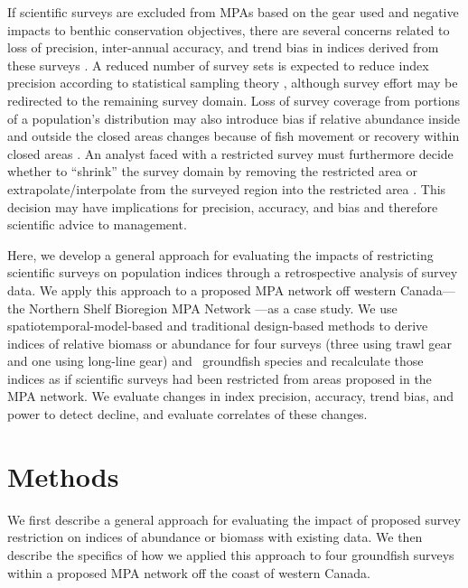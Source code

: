 \documentclass[12pt]{article}
\begin{document}
If scientific surveys are excluded from MPAs based on the gear used and negative impacts to benthic conservation objectives, there are several concerns related to loss of precision, inter-annual accuracy, and trend bias in indices derived from these surveys \citep{field2006, rideout2017, saarman2018, benoit2020national, benoit2020gulf, ices2023}.
A reduced number of survey sets is expected to reduce index precision according to statistical sampling theory \citep{cochran1977}, although survey effort may be redirected to the remaining survey domain.
Loss of survey coverage from portions of a population's distribution may also introduce bias if relative abundance inside and outside the closed areas changes because of fish movement or recovery within closed areas \citep[][]{benoit2020national}.
An analyst faced with a restricted survey must furthermore decide whether to ``shrink'' the survey domain by removing the restricted area \citep{rideout2017, benoit2020national} or extrapolate/interpolate from the surveyed region into the restricted area \citep{benoit2020national}.
This decision may have implications for precision, accuracy, and bias and therefore scientific advice to management.

Here, we develop a general approach for evaluating the impacts of restricting scientific surveys on population indices through a retrospective analysis of survey data.
We apply this approach to a proposed MPA network off western Canada---the Northern Shelf Bioregion MPA Network \citep[][Fig.~\ref{fig:map}]{dfo2022networkactionplan}---as a case study.
We use spatiotemporal-model-based and traditional design-based methods to derive indices of relative biomass or abundance for four surveys (three using trawl gear and one using long-line gear) and \nSpp\ groundfish species and recalculate those indices as if scientific surveys had been restricted from areas proposed in the MPA network.
We evaluate changes in index precision, accuracy, trend bias, and power to detect decline, and evaluate correlates of these changes.

\section*{Methods}

We first describe a general approach for evaluating the impact of proposed survey restriction on indices of abundance or biomass with existing data.
We then describe the specifics of how we applied this approach to four groundfish surveys within a proposed MPA network off the coast of western Canada.
\end{document}
